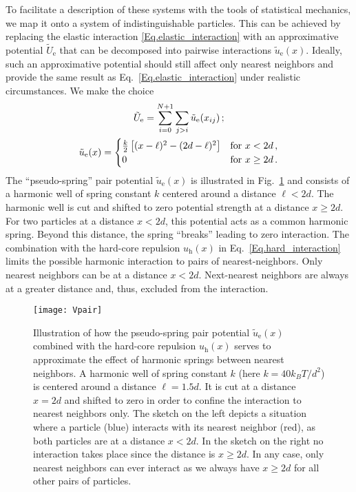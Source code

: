 \documentclass[aps,pre,twocolumn,superscriptaddress,nofootinbib]{revtex4}
\begin{document}
To facilitate a description of these systems with the tools of statistical mechanics, we map it onto a system of indistinguishable particles. 
This can be achieved by replacing the elastic interaction \eqref{Eq.elastic_interaction} with an approximative potential $\tilde{U}_\textrm{e}$ that can be decomposed into pairwise interactions $\tilde{u}_\textrm{e}(x)$. 
Ideally, such an approximative potential should still affect only nearest neighbors and provide the same result as Eq.~\eqref{Eq.elastic_interaction} under realistic circumstances.
We make the choice
%
\begin{equation}
	\begin{gathered}
		\tilde{U}_\textrm{e} = \sum_{i = 0}^{N+1} \sum_{j > i} \tilde{u}_\textrm{e}(x_{ij}) \, ; \\
		\tilde{u}_\textrm{e}(x) = \begin{cases}
			\frac{k}{2} \left[ (x - \ell)^2 - (2d - \ell)^2 \right]	&	\textrm{for} \,\, x < 2d \, , \\
			0	&	\textnormal{for} \,\, x  \geq 2d \, .
		\end{cases}
	\end{gathered}
	\label{Eq.pseudoelastic_interaction}
\end{equation}
%
The ``pseudo-spring'' pair potential $\tilde{u}_\textrm{e}(x)$ is illustrated in Fig.~\ref{Fig.Vpair} and consists of a harmonic well of spring constant $k$ centered around a distance $\ell < 2d$. 
The harmonic well is cut and shifted to zero potential strength at a distance $x \geq 2d$. 
For two particles at a distance $x < 2d$, this potential acts as a common harmonic spring.
Beyond this distance, the spring ``breaks'' leading to zero interaction.
The combination with the hard-core repulsion $u_\textrm{h}(x)$ in Eq.~\eqref{Eq.hard_interaction} limits the possible harmonic interaction to pairs of nearest-neighbors. 
Only nearest neighbors can be at a distance $x < 2d$. 
Next-nearest neighbors are always at a greater distance and, thus, excluded from the interaction. 

%
\begin{figure}
	\texttt{[image: Vpair]}
	\caption{Illustration of how the pseudo-spring pair potential $\tilde{u}_\textrm{e}(x)$ combined with the hard-core repulsion $u_\textrm{h}(x)$ serves to approximate the effect of harmonic springs between nearest neighbors. A harmonic well of spring constant $k$ (here $k = 40 k_BT / d^2$) is centered around a distance $\ell = 1.5d$. It is cut at a distance $x = 2d$ and shifted to zero in order to confine the interaction to nearest neighbors only. The sketch on the left depicts a situation where a particle (blue) interacts with its nearest neighbor (red), as both particles are at a distance $x < 2d$. In the sketch on the right no interaction takes place since the distance is $x \geq 2d$. In any case, only nearest neighbors can ever interact as we always have $x \geq 2d$ for all other pairs of particles.}
	\label{Fig.Vpair}
\end{figure}
% 
\end{document}
